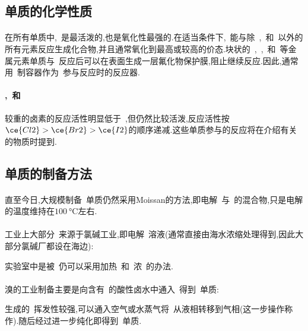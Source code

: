 \documentclass{ctexbook}
\begin{document}
\subsection{单质的化学性质}
\paragraph{}在所有单质中,~是最活泼的,也是氧化性最强的.在适当条件下,~能与除~,~和~以外的所有元素反应生成化合物,并且通常氧化到最高或较高的价态.块状的~,~,~和~等金属元素单质与~反应后可以在表面生成一层氟化物保护膜,阻止继续反应.因此,通常用~制容器作为~参与反应时的反应器.
\paragraph{,~和~}
较重的卤素的反应活性明显低于~,但仍然比较活泼,反应活性按$\ce{Cl2}>\ce{Br2}>\ce{I2}$的顺序递减.这些单质参与的反应将在介绍有关的物质时提到.
\subsection{单质的制备方法}
\paragraph{}
直至今日,大规模制备~单质仍然采用Moissan的方法,即电解~与~的混合物,只是电解的温度维持在$\SI{100}{\celsius}$左右.
\paragraph{}
工业上大部分~来源于氯碱工业,即电解~溶液(通常直接由海水浓缩处理得到,因此大部分氯碱厂都设在海边):
\begin{tightcenter}
\end{tightcenter}
实验室中是被~仍可以采用加热~和~浓~的办法.
\paragraph{}
溴的工业制备主要是向含有~的酸性卤水中通入~得到~单质:
\begin{tightcenter}
\end{tightcenter}
生成的~挥发性较强,可以通入空气或水蒸气将~从液相转移到气相(这一步操作称作).随后经过进一步纯化即得到~单质.
\end{document}
